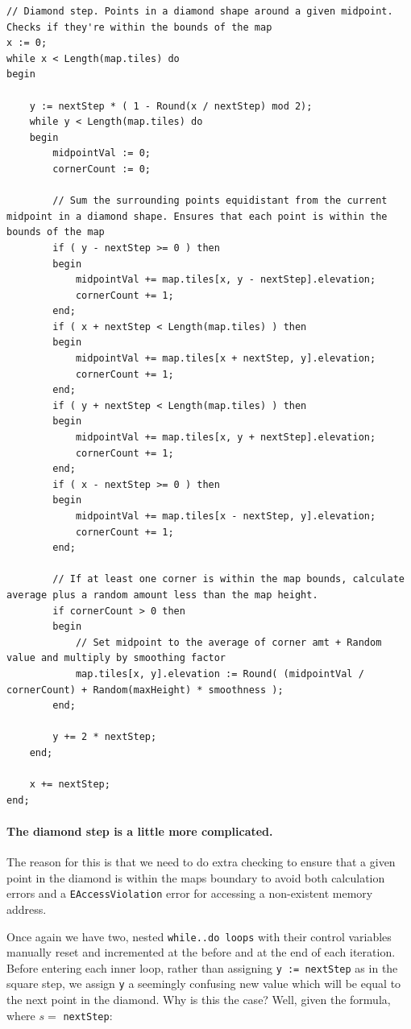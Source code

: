 \documentclass{article}
\begin{document}
\begin{verbatim}
// Diamond step. Points in a diamond shape around a given midpoint. Checks if they're within the bounds of the map
x := 0;
while x < Length(map.tiles) do
begin

	y := nextStep * ( 1 - Round(x / nextStep) mod 2);
	while y < Length(map.tiles) do
	begin
		midpointVal := 0;
		cornerCount := 0;

		// Sum the surrounding points equidistant from the current midpoint in a diamond shape. Ensures that each point is within the bounds of the map
		if ( y - nextStep >= 0 ) then
		begin
			midpointVal += map.tiles[x, y - nextStep].elevation;
			cornerCount += 1;
		end;
		if ( x + nextStep < Length(map.tiles) ) then
		begin
			midpointVal += map.tiles[x + nextStep, y].elevation;
			cornerCount += 1;
		end;
		if ( y + nextStep < Length(map.tiles) ) then
		begin
			midpointVal += map.tiles[x, y + nextStep].elevation;
			cornerCount += 1;
		end;
		if ( x - nextStep >= 0 ) then
		begin
			midpointVal += map.tiles[x - nextStep, y].elevation;
			cornerCount += 1;
		end;

		// If at least one corner is within the map bounds, calculate average plus a random amount less than the map height.
		if cornerCount > 0 then
		begin
			// Set midpoint to the average of corner amt + Random value and multiply by smoothing factor
			map.tiles[x, y].elevation := Round( (midpointVal / cornerCount) + Random(maxHeight) * smoothness );
		end;

		y += 2 * nextStep;
	end;

	x += nextStep;
end;
\end{verbatim}

\restoregeometry

\paragraph{The diamond step is a little more complicated.} The reason for this is that we need to do extra checking to ensure that a given point in the diamond is within the maps boundary to avoid both calculation errors and a \texttt{EAccessViolation} error for accessing a non-existent memory address.

Once again we have two, nested \texttt{while..do loops} with their control variables manually reset and incremented at the before and at the end of each iteration. Before entering each inner loop, rather than assigning \texttt{y := nextStep} as in the square step, we assign \texttt{y} a seemingly confusing new value which will be equal to the next point in the diamond. Why is this the case? Well, given the formula, where $s=$ \texttt{nextStep}:
\end{document}
